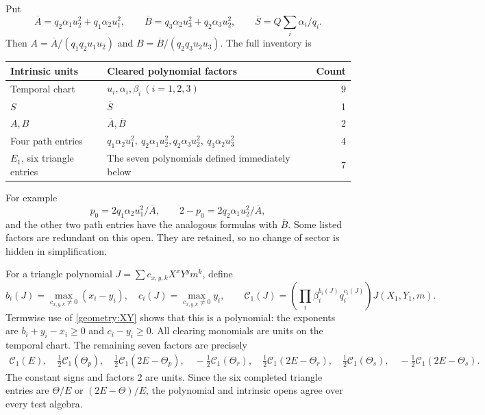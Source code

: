 \documentclass[11pt,a4paper]{article}
\theoremstyle{remark}\newtheorem{remark}[theorem]{Remark}
\newcommand{\Ab}{\overline A}\newcommand{\Bb}{\overline B}
\begin{document}
Put
\[
 \Ab=q_2\alpha_1u_2^2+q_1\alpha_2u_1^2,\qquad
 \Bb=q_3\alpha_2u_3^2+q_2\alpha_3u_2^2,\qquad
 \overline S=Q\sum_i\alpha_i/q_i.
\]
Then
\(A=\Ab/(q_1q_2u_1u_2)\) and
\(B=\Bb/(q_2q_3u_2u_3)\). The full inventory is
\begin{center}\small
\begin{tabular}{p{.29\linewidth}p{.55\linewidth}r}
\hline
Intrinsic units&Cleared polynomial factors&Count\\\hline
Temporal chart&\(u_i,\alpha_i,\beta_i\ (i=1,2,3)\)&9\\
\(S\)&\(\overline S\)&1\\
\(A,B\)&\(\Ab,\Bb\)&2\\
Four path entries&\(q_1\alpha_2u_1^2,\ q_2\alpha_1u_2^2,
q_2\alpha_3u_2^2,\ q_3\alpha_2u_3^2\)&4\\
\(E_1\), six triangle entries&The seven polynomials defined immediately below&7\\\hline
\end{tabular}
\end{center}
For example
\[
 p_0=2q_1\alpha_2u_1^2/\Ab,\qquad
 2-p_0=2q_2\alpha_1u_2^2/\Ab,
\]
and the other two path entries have the analogous formulas with \(\Bb\).
Some listed factors are redundant on this open. They are retained, so no
change of sector is hidden in simplification.

For a triangle polynomial \(J=\sum c_{x,y,k}X^xY^ym^k\), define
\[
 b_i(J)=\max_{c_{x,y,k}\ne0}(x_i-y_i),\quad
 c_i(J)=\max_{c_{x,y,k}\ne0}y_i,\qquad
 \mathcal C_1(J)=\left(\prod_i\beta_i^{b_i(J)}q_i^{c_i(J)}\right)
                      J(X_1,Y_1,m).
\]
Termwise use of \eqref{geometry:XY} shows that this is a polynomial:
the exponents are \(b_i+y_i-x_i\ge0\) and \(c_i-y_i\ge0\).
All clearing monomials are units on the temporal chart. The remaining
seven factors are precisely
\[
 \begin{gathered}
 \mathcal C_1(E),\quad
 \tfrac12\mathcal C_1(\Theta_p),\quad
 \tfrac12\mathcal C_1(2E-\Theta_p),\quad
 -\tfrac12\mathcal C_1(\Theta_r),\quad
 \tfrac12\mathcal C_1(2E-\Theta_r),\quad
 \tfrac12\mathcal C_1(\Theta_s),\quad
 -\tfrac12\mathcal C_1(2E-\Theta_s).
 \end{gathered}
\]
The constant signs and factors \(2\) are units. Since the six completed
triangle entries are \(\Theta/E\) or \((2E-\Theta)/E\), the polynomial
and intrinsic opens agree over every test algebra.
\end{document}
